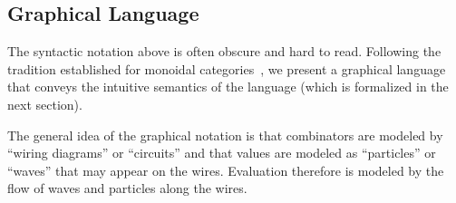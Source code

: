 \documentclass[preprint]{sigplanconf}
\begin{document}
\subsection{Graphical Language}

The syntactic notation above is often obscure and hard to read.
Following the tradition established for monoidal
categories~\cite{springerlink:10.1007/978-3-642-12821-94}, we present
a graphical language that conveys the intuitive semantics of the
language (which is formalized in the next section).

The general idea of the graphical notation is that combinators are modeled by
``wiring diagrams'' or ``circuits'' and that values are modeled as
``particles'' or ``waves'' that may appear on the wires. Evaluation therefore
is modeled by the flow of waves and particles along the wires.

\end{document}
